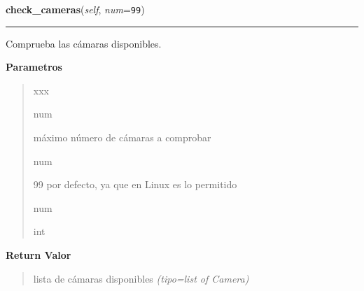 \hspace{.8\funcindent}\begin{boxedminipage}{\funcwidth}

    \raggedright \textbf{check\_cameras}(\textit{self}, \textit{num}={\tt 99})

    \vspace{-1.5ex}

    \rule{\textwidth}{0.5\fboxrule}
\setlength{\parskip}{2ex}
Comprueba las cámaras disponibles.

\setlength{\parskip}{1ex}
      \textbf{Parametros}
      \vspace{-1ex}

      \begin{quote}
        \begin{Ventry}{xxx}

          \item[num]


máximo número de cámaras a comprobar
          \item[num]


99 por defecto, ya que en Linux es lo permitido
          \item[num]


int
        \end{Ventry}

      \end{quote}

      \textbf{Return Valor}
    \vspace{-1ex}

      \begin{quote}

lista de cámaras disponibles
      {\it (tipo=list of Camera)}

      \end{quote}

    \end{boxedminipage}

    \label{src:cameras:Cameras:show_and_select_camera}

    \vspace{0.5ex}


